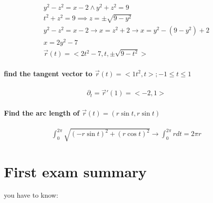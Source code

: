 \documentclass[11pt,fleqn]{book} %
\begin{document}
\begin{gather}
    y^2 - z^2 = x-2 \land y^2 + z^2 = 9\\
    t^2 + z^2 = 9 \implies z = \pm \sqrt{9-y^2}\\
    y^2 - z^2 = x-2 \to x = z^2 + 2 \to x = y^2 - (9-y^2) + 2\\
    x = 2y^2 - 7\\
    \vec{r}(t) = <2t^2-7, t, \pm \sqrt{9-t^2} >
\end{gather}

\paragraph*{find the tangent vector to $\vec{r}(t) = <1t^2,t>; -1 \leq t \leq 1$}
\begin{gather}
    \partial_t = \vec{r}' (1) = <-2,1>
\end{gather}

\paragraph*{Find the arc length of $\vec{r}(t) = (r \sin t, r \sin t)$}
\begin{gather}
    \int_{0}^{2\pi} \sqrt{(-r \sin t)^2 + (r \cos t)^2} \to \int_{0}^{2\pi} r dt = 2 \pi r
\end{gather}

\section{First exam summary}
you have to know:
\end{document}
